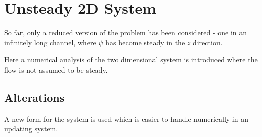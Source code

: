 \documentclass{X:/Documents/Coding/Latex/myreport}
\begin{document}
\clearpage















\section{Unsteady 2D System}
So far, only a reduced version of the problem has been considered - one in an infinitely long channel, where $\psi$ has become steady in the $z$ direction.

Here a numerical analysis of the two dimensional system is introduced where the flow is not assumed to be steady.


\subsection{Alterations}
A new form for the system is used which is easier to handle numerically in an updating system.
\end{document}
